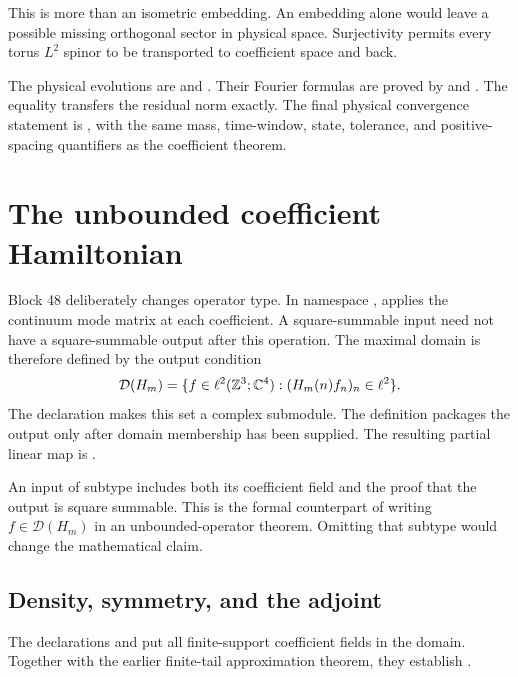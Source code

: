 This is more than an isometric embedding. An embedding alone would leave a possible missing orthogonal sector in physical space. Surjectivity permits every torus \(L^2\) spinor to be transported to coefficient space and back.

The physical evolutions are  and . Their Fourier formulas are proved by  and . The equality  transfers the residual norm exactly. The final physical convergence statement is , with the same mass, time-window, state, tolerance, and positive-spacing quantifiers as the coefficient theorem.

\section{The unbounded coefficient Hamiltonian}

Block 48 deliberately changes operator type. In namespace ,  applies the continuum mode matrix at each coefficient. A square-summable input need not have a square-summable output after this operation. The maximal domain is therefore defined by the output condition
\[
 \mathcal D(H_m)
 =\{f\in\ell^2(\mathbb Z^3;\mathbb C^4):(H_m(n)f_n)_n\in\ell^2\}.
\]
The declaration  makes this set a complex submodule. The definition  packages the output only after domain membership has been supplied. The resulting partial linear map is .

An input of subtype  includes both its coefficient field and the proof that the output is square summable. This is the formal counterpart of writing \(f\in\mathcal D(H_m)\) in an unbounded-operator theorem. Omitting that subtype would change the mathematical claim.

\subsection{Density, symmetry, and the adjoint}

The declarations  and  put all finite-support coefficient fields in the domain. Together with the earlier finite-tail approximation theorem, they establish .

